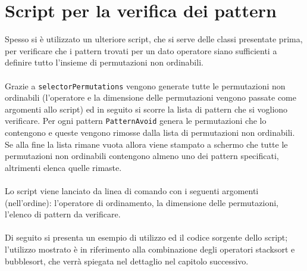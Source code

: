 \section{Script per la verifica dei pattern}
Spesso si \`e utilizzato un ulteriore script, che si serve delle classi presentate prima, per verificare che i pattern trovati per un dato operatore siano sufficienti a definire tutto l'insieme di permutazioni non ordinabili.\\\\
Grazie a \texttt{selectorPermutations} vengono generate tutte le permutazioni non ordinabili (l'operatore e la dimensione delle permutazioni vengono passate come argomenti allo script) ed in seguito si scorre la lista di pattern che si vogliono verificare. Per ogni pattern \texttt{PatternAvoid} genera le permutazioni che lo contengono e queste vengono rimosse dalla lista di permutazioni non ordinabili. Se alla fine la lista rimane vuota allora viene stampato a schermo che tutte le permutazioni non ordinabili contengono almeno uno dei pattern specificati, altrimenti elenca quelle rimaste.\\\\
Lo script viene lanciato da linea di comando con i seguenti argomenti (nell'ordine): l'operatore di ordinamento, la dimensione delle permutazioni, l'elenco di pattern da verificare.\\\\
Di seguito si presenta un esempio di utilizzo ed il codice sorgente dello script; l'utilizzo mostrato \`e in riferimento alla combinazione degli operatori stacksort e bubblesort, che verr\`a spiegata nel dettaglio nel capitolo successivo.\\


